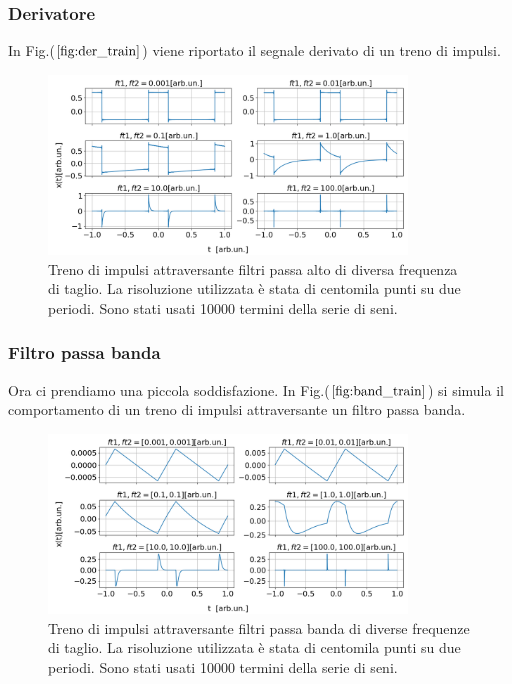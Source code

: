 \documentclass{article}
\begin{document}
            \subsubsection{Derivatore}
                In Fig.($\ref{fig:der_train}$) viene riportato il segnale derivato di un treno di impulsi.     
                    
                    \begin{figure}[H]
                        \centering
                        \includegraphics[width=0.85\textwidth]{der_train.png} %
                        \caption{Treno di impulsi attraversante filtri passa alto di diversa frequenza di taglio.
                        La risoluzione utilizzata è stata di centomila punti su due periodi.
                        Sono stati usati 10000 termini della serie di seni.}
                        \label{fig:der_train}
                    \end{figure}    

            \subsubsection{Filtro passa banda}
                Ora ci prendiamo una piccola soddisfazione.
                In Fig.($\ref{fig:band_train}$) si simula il comportamento di un treno di impulsi
                attraversante un filtro passa banda.
                \begin{figure}[H]
                    \centering
                    \includegraphics[width=0.85\textwidth]{band_train.png} %
                    \caption{Treno di impulsi attraversante filtri passa banda di diverse frequenze di taglio.
                    La risoluzione utilizzata è stata di centomila punti su due periodi.
                    Sono stati usati 10000 termini della serie di seni.}
                    \label{fig:band_train}
                \end{figure}
\end{document}
